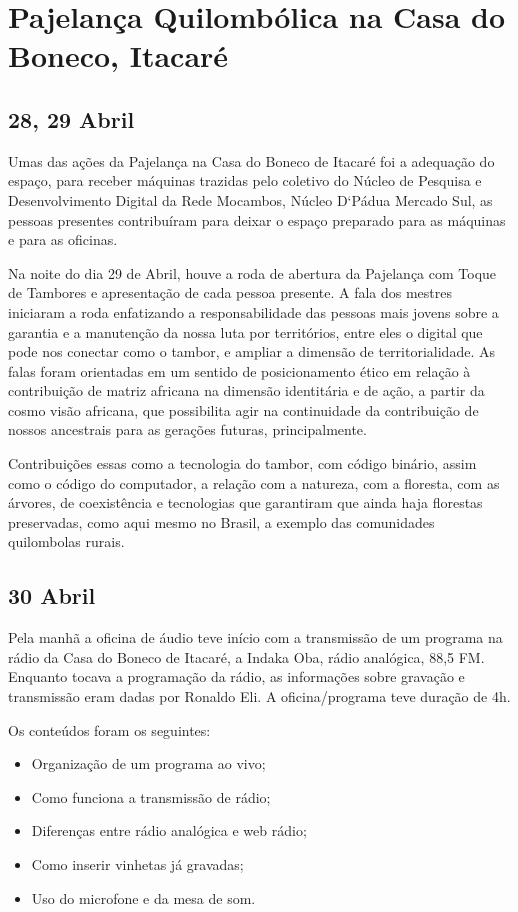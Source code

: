 \documentclass[a4paper, 11pt, oneside]{Relatorio_sem_2}  %
\begin{document}
\section{Pajelança Quilombólica na Casa do Boneco, Itacaré}

\subsection{28, 29 Abril}
Umas das ações da Pajelança na Casa do Boneco de Itacaré foi a
adequação do espaço, para receber máquinas trazidas pelo coletivo do
Núcleo de Pesquisa e Desenvolvimento Digital da Rede Mocambos, Núcleo
D`Pádua Mercado Sul, as pessoas presentes contribuíram para deixar o
espaço preparado para as máquinas e para as oficinas.

Na noite do dia 29 de Abril, houve a roda de abertura da Pajelança com
Toque de Tambores e apresentação de cada pessoa presente.  A fala dos
mestres iniciaram a roda enfatizando a responsabilidade das pessoas
mais jovens sobre a garantia e a manutenção da nossa luta por
territórios, entre eles o digital que pode nos conectar como o tambor,
e ampliar a dimensão de territorialidade. As falas foram orientadas
em um sentido de posicionamento ético em relação à contribuição de
matriz africana na dimensão identitária e de ação, a partir da cosmo
visão africana, que possibilita agir na continuidade da contribuição
de nossos ancestrais para as gerações futuras, principalmente.

Contribuições essas como a tecnologia do tambor, com código binário,
assim como o código do computador, a relação com a natureza, com a
floresta, com as árvores, de coexistência e tecnologias que garantiram
que ainda haja florestas preservadas, como aqui mesmo no Brasil, a
exemplo das comunidades quilombolas rurais.

\subsection{30 Abril}
Pela manhã a oficina de áudio teve início com a transmissão de um
programa na rádio da Casa do Boneco de Itacaré, a Indaka Oba, rádio
analógica, 88,5 FM. Enquanto tocava a programação da rádio, as
informações sobre gravação e transmissão eram dadas por Ronaldo Eli.
A oficina/programa teve duração de 4h.

Os conteúdos foram os seguintes:
\begin{itemize}
\item Organização de um programa ao vivo;
\item Como funciona a transmissão de rádio;
\item Diferenças entre rádio analógica e web rádio;
\item Como inserir vinhetas já gravadas;
\item Uso do microfone e da mesa de som.
\end{itemize}
\end{document}
